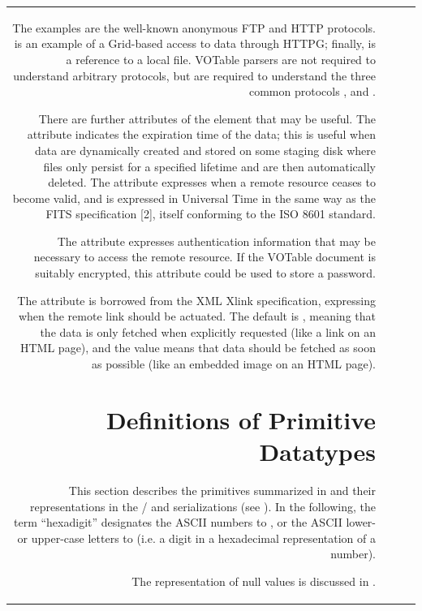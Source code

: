 \begin{tabular}{RRCp{0.8\textwidth}}
\begin{center}
{The examples are the well-known anonymous FTP and HTTP protocols.
 is an example of a Grid-based access to data through HTTPG;
finally,  is a reference to a local file.
VOTable parsers are not required to understand arbitrary protocols,
but are required to understand the  three common protocols
,  and .

There are further attributes of the {}
element that may be useful. The {}
attribute indicates the expiration time of the data;
this is useful when data are dynamically created and stored 
on some staging disk where files only persist for a specified 
lifetime and are then automatically deleted.
The {}
attribute expresses when a remote resource ceases to become valid,
and is expressed in Universal Time in the same way as the FITS
specification [2], itself conforming to the ISO 8601 standard.

The {}
attribute expresses authentication information that may be necessary
to access the remote resource. If  the VOTable document is suitably
encrypted, this attribute could be used to store a password.

The {}
attribute is borrowed from the XML Xlink specification, expressing
when the remote link should be actuated. The default is {},
meaning that the data is only fetched when explicitly requested (like
a link on an HTML page), and the {}
value means that data should be fetched as soon as possible (like an
embedded image on an HTML page).

\section{Definitions of Primitive Datatypes}
\label{sec:datatypes}

This section describes the primitives summarized in 
and their representations in the /  
and  serializations 
(see ).
In the following, the term ``hexadigit'' designates the ASCII numbers
 to , or the ASCII lower- or upper-case letters
 to  (i.e. a digit in a hexadecimal representation
of a number).

The representation of null values is discussed in .

}
\end{center}
\end{tabular}
